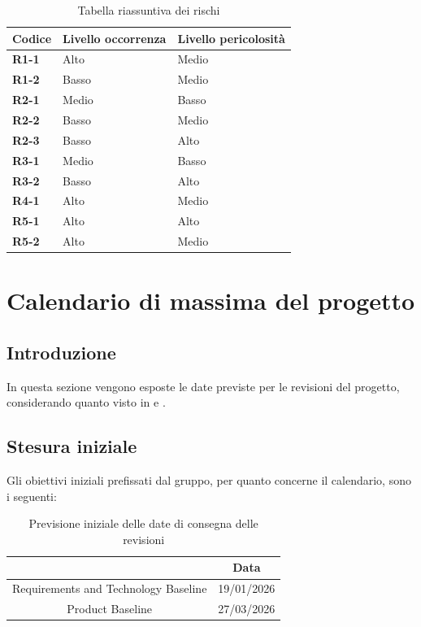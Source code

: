 \documentclass[a4paper,12pt]{article}
\begin{document}
        \begin{table}[H]
        \centering
        \caption{Tabella riassuntiva dei rischi}
        \label{tab:riass_rischi}
            \begin{tabular}{|l|l|l|}
            \hline
            \textbf{Codice} & \textbf{Livello occorrenza} & \textbf{Livello pericolosità}\\
            \hline
            \textbf{R1-1} & Alto & Medio \\
            \hline
            \textbf{R1-2} & Basso & Medio \\
            \hline
            \textbf{R2-1} & Medio & Basso \\
            \hline
            \textbf{R2-2} & Basso & Medio \\
            \hline
            \textbf{R2-3} & Basso & Alto \\
            \hline
            \textbf{R3-1} & Medio & Basso \\
            \hline
            \textbf{R3-2} & Basso & Alto \\
            \hline
            \textbf{R4-1} & Alto & Medio \\
            \hline
            \textbf{R5-1} & Alto & Alto \\
            \hline
            \textbf{R5-2} & Alto & Medio \\
            \hline
            \end{tabular}
        \end{table}

\newpage
\section{Calendario di massima del progetto}
    \subsection{Introduzione}
        In questa sezione vengono esposte le date previste per le revisioni del progetto, considerando quanto visto in \textbf{} e \textbf{}.
    \subsection{Stesura iniziale}
        Gli obiettivi iniziali prefissati dal gruppo, per quanto concerne il calendario, sono i seguenti:
        \begin{table}[H]
            \centering
            \caption{Previsione iniziale delle date di consegna delle revisioni}
            \label{tab:cal1}
            \begin{tabular}{|c|c|}
            \hline
                \rowcolor{lightgray}{\textbf{Revisione}} & {\textbf{Data}}  \\
            \hline
                Requirements and Technology Baseline & 19/01/2026 \\
            \hline
                Product Baseline & 27/03/2026 \\
            \hline
            \end{tabular}
        \end{table}
\end{document}
